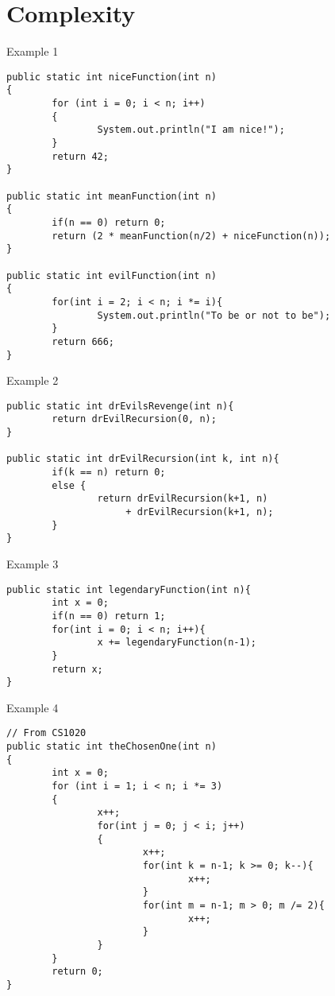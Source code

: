 \documentclass[presentation]{beamer}
\begin{document}
\section{Complexity}
\label{sec:org70524d8}
\begin{frame}[label={sec:orge929e76},fragile,shrink=30]{Example 1}
 \begin{verbatim}
public static int niceFunction(int n)
{
        for (int i = 0; i < n; i++)
        {
                System.out.println("I am nice!");
        }
        return 42;
}

public static int meanFunction(int n)
{
        if(n == 0) return 0;
        return (2 * meanFunction(n/2) + niceFunction(n));
}

public static int evilFunction(int n)
{
        for(int i = 2; i < n; i *= i){
                System.out.println("To be or not to be");
        }
        return 666;
}

\end{verbatim}
\end{frame}
\begin{frame}[label={sec:orgec0e1ae},fragile]{Example 2}
 \begin{verbatim}
public static int drEvilsRevenge(int n){
        return drEvilRecursion(0, n);
}

public static int drEvilRecursion(int k, int n){
        if(k == n) return 0;
        else {
                return drEvilRecursion(k+1, n)
                     + drEvilRecursion(k+1, n);
        }
}

\end{verbatim}
\end{frame}
\begin{frame}[label={sec:org4eafab7},fragile]{Example 3}
 \begin{verbatim}
public static int legendaryFunction(int n){
        int x = 0;
        if(n == 0) return 1;
        for(int i = 0; i < n; i++){
                x += legendaryFunction(n-1);
        }
        return x;
}
\end{verbatim}
\end{frame}
\begin{frame}[label={sec:org1a55a7a},fragile,shrink=30]{Example 4}
 \begin{verbatim}
// From CS1020
public static int theChosenOne(int n)
{
        int x = 0;
        for (int i = 1; i < n; i *= 3)
        {
                x++;
                for(int j = 0; j < i; j++)
                {
                        x++;
                        for(int k = n-1; k >= 0; k--){
                                x++;
                        }
                        for(int m = n-1; m > 0; m /= 2){
                                x++;
                        }
                }
        }
        return 0;
}
\end{verbatim}
\end{frame}
\end{document}
